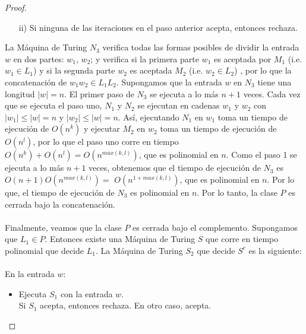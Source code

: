\documentclass[letterpaper,10pt]{article}
\begin{document}
\begin{enumerate}
\begin{itemize}
\begin{proof}
\begin{itemize}
                 \item[ii)] Si ninguna de las iteraciones en el paso anterior
                 acepta, entonces rechaza.

             \end{itemize}
             
             La Máquina de Turing $N_3$ verifica todas las formas posibles de 
             dividir la entrada $w$ en dos partes: $w_1$, $w_2$; y verifica si
             la primera parte $w_1$ es aceptada por $M_1$ (i.e. $w_1 \in L_1$)
             y si la segunda parte $w_2$ es aceptada $M_2$ (i.e. $w_2 \in L_2$)
             , por lo que la concatenación de $w_1w_2 \in L_1L_2$. Supongamos
             que la entrada $w$ en $N_3$ tiene una longitud $|w| = n$. El
             primer paso de $N_3$ se ejecuta a lo más $n + 1$ veces. Cada vez
             que se ejecuta el paso uno, $N_1$ y $N_2$ se ejecutan en cadenas
             $w_1$ y $w_2$ con $|w_1| \leq |w| = n$ y $|w_2| \leq |w| = n$.
             Así, ejecutando $N_1$ en $w_1$ toma un tiempo de ejecución de
             $O(n^{k})$ y ejecutar $M_2$ en $w_2$ toma un tiempo de ejecución
             de $O(n^{l})$, por lo que el paso uno corre en tiempo 
             $O(n^{k}) + O(n^{l}) = O(n^{max(k, l)})$, que es polinomial en $n$.
             Como el paso 1 se ejecuta a lo más $n + 1$ veces, obtenemos que 
             el tiempo de ejecución de $N_3$ es $O(n + 1)O(n^{max(k, l)}) = $
             $O(n^{1 + max(k, l)})$, que es polinomial en $n$. Por lo que, 
             el tiempo de ejecución de $N_3$ es polinomial en $n$. Por lo tanto,
             la clase $P$ es cerrada bajo la concatenación. \\ \\
             Finalmente, veamos que la clase $P$ es cerrada bajo el complemento.
             Supongamos que $L_1 \in P$. Entonces existe una Máquina de 
             Turing $S$ que corre en tiempo polinomial que decide $L_1$. La
             Máquina de Turing $S_2$ que decide $S^{c}$ es la siguiente: \\ \\
            En la entrada $w$:
            
            \begin{itemize}
                \item Ejecuta $S_1$ con la entrada $w$. \\ Si $S_1$ acepta,
                entonces rechaza. En otro caso, acepta.
            \end{itemize}
            

\end{proof}
\end{itemize}
\end{enumerate}
\end{document}
